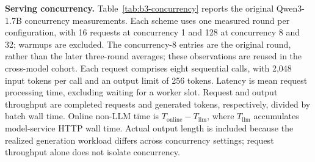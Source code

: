 \noindent\textbf{Serving concurrency.}
Table~\ref{tab:b3-concurrency} reports the original Qwen3-1.7B concurrency
measurements. Each scheme uses one measured round per configuration, with 16
requests at concurrency 1 and 128 at concurrency 8 and 32; warmups are excluded.
The concurrency-8 entries are the original round, rather than the later
three-round averages; these observations are reused in the cross-model cohort.
Each request comprises eight sequential calls, with
2,048 input tokens per call and an output limit of 256 tokens.
Latency is mean request processing time, excluding waiting for a worker slot.
Request and output throughput
are completed requests and generated tokens, respectively, divided by batch wall time.
Online non-LLM time is $T_{\mathrm{online}}-T_{\mathrm{llm}}$, where
$T_{\mathrm{llm}}$ accumulates model-service HTTP wall time.
Actual output length is included because the realized generation workload differs
across concurrency settings; request throughput alone does not isolate concurrency.
